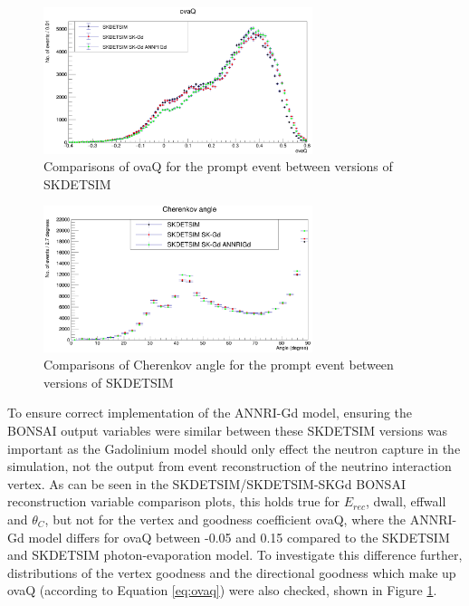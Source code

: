\begin{figure}[htp]
    \centering
    \includegraphics[width=0.7\textwidth]{Figures/ovaQ_compare.png}
    \caption{Comparisons of ovaQ for the prompt event between versions of SKDETSIM }
    \label{fig:ovaQ_compare}

\end{figure}

\begin{figure}[htp]
    \centering
    \includegraphics[width=0.7\textwidth]{Figures/thetaC_compare.png}
    \caption{Comparisons of Cherenkov angle for the prompt event between versions of SKDETSIM}
    \label{fig:thetaC_compare}

\end{figure}


To ensure correct implementation of the ANNRI-Gd model, ensuring the BONSAI output variables were similar between these SKDETSIM versions was important as the Gadolinium model should only effect the neutron capture in the simulation, not the output from event reconstruction of the neutrino interaction vertex. As can be seen in the SKDETSIM/SKDETSIM-SKGd BONSAI reconstruction variable comparison plots, this holds true for $E_{rec}$, dwall, effwall and $\theta_C$, but not for the vertex and goodness coefficient ovaQ, where the ANNRI-Gd model differs for ovaQ between -0.05 and 0.15 compared to the SKDETSIM and SKDETSIM photon-evaporation model. To investigate this difference further, distributions of the vertex goodness and the directional goodness which make up ovaQ (according to Equation \ref{eq:ovaq}) were also checked, shown in Figure \ref{fig:ovaQ_compare}.



